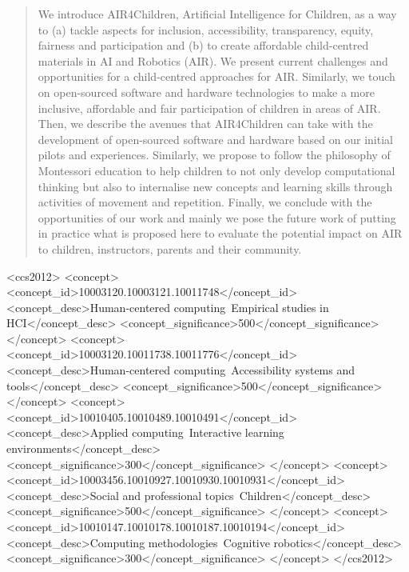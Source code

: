 \documentclass[sigconf]{acmart}
\begin{document}
\begin{abstract}
We introduce AIR4Children, Artificial Intelligence for Children, as a way to (a) tackle aspects for inclusion, accessibility, transparency, equity, fairness and participation and (b) to create affordable child-centred materials in AI and Robotics (AIR).
We present current challenges and opportunities for a child-centred approaches for AIR. 
Similarly, we touch on open-sourced software and hardware technologies to make a more inclusive, affordable and fair participation of children in areas of AIR. 
Then, we describe the avenues that AIR4Children can take with the development of open-sourced software and hardware based on our initial pilots and experiences.
Similarly, we propose to follow the philosophy of Montessori education to help children to not only develop computational thinking but also to internalise new concepts and learning skills through activities of movement and repetition.
Finally, we conclude with the opportunities of our work and mainly we pose the future work of putting in practice what is proposed here to evaluate the potential impact on AIR to children, instructors, parents and their community. 
\end{abstract}

\begin{CCSXML}
<ccs2012>
     <concept>
         <concept_id>10003120.10003121.10011748</concept_id>
         <concept_desc>Human-centered computing~Empirical studies in HCI</concept_desc>
         <concept_significance>500</concept_significance>
         </concept>
     <concept>
         <concept_id>10003120.10011738.10011776</concept_id>
         <concept_desc>Human-centered computing~Accessibility systems and tools</concept_desc>
         <concept_significance>500</concept_significance>
         </concept>
     <concept>
         <concept_id>10010405.10010489.10010491</concept_id>
         <concept_desc>Applied computing~Interactive learning environments</concept_desc>
         <concept_significance>300</concept_significance>
         </concept>
     <concept>
         <concept_id>10003456.10010927.10010930.10010931</concept_id>
         <concept_desc>Social and professional topics~Children</concept_desc>
         <concept_significance>500</concept_significance>
         </concept>
     <concept>
         <concept_id>10010147.10010178.10010187.10010194</concept_id>
         <concept_desc>Computing methodologies~Cognitive robotics</concept_desc>
         <concept_significance>300</concept_significance>
         </concept>
</ccs2012>
\end{CCSXML}
\end{document}
